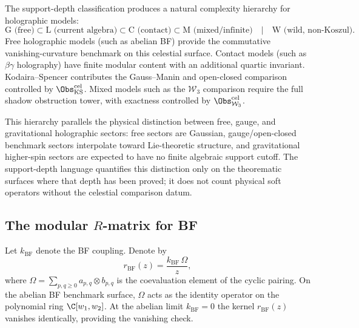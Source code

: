 \begin{remark}
The support-depth classification produces a natural complexity hierarchy for holographic
models:
\[
\text{G (free)} \subset \text{L (current algebra)} \subset \text{C (contact)}
\subset \text{M (mixed/infinite)}
\quad\bigl|\quad
\text{W (wild, non-Koszul)}.
\]
Free holographic models (such as abelian BF) provide the commutative
vanishing-curvature benchmark on this celestial surface.
Contact models (such as $\beta\gamma$ holography) have finite modular content with an
additional quartic invariant. Kodaira--Spencer contributes the Gauss--Manin
and open-closed comparison controlled by
$\Obs^{\mathrm{cel}}_{\mathrm{KS}}$. Mixed models such as the
$\mathcal{W}_3$ comparison require the full shadow obstruction tower,
with exactness controlled by $\Obs^{\mathrm{cel}}_{\mathcal W_3}$.

This hierarchy parallels the physical distinction between free, gauge, and
gravitational holographic sectors: free sectors are Gaussian, gauge/open-closed
benchmark sectors interpolate toward Lie-theoretic structure, and gravitational
higher-spin sectors are expected to have no finite algebraic support cutoff.
The support-depth language quantifies this distinction only on the theorematic
surfaces where that depth has been proved; it does not count physical soft
operators without the celestial comparison datum.
\end{remark}

\subsection{The modular $R$-matrix for BF}

\begin{definition}
Let $k_{\mathrm{BF}}$ denote the BF coupling. Denote by
\begin{equation}
r_{\mathrm{BF}}(z) = \frac{k_{\mathrm{BF}}\,\Omega}{z},
\end{equation}
where $\Omega = \sum_{p,q \geq 0} a_{p,q} \otimes b_{p,q}$ is the coevaluation
element of the cyclic pairing. On the abelian BF benchmark surface, $\Omega$
acts as the identity operator on the polynomial ring $\C[w_1, w_2]$. At the
abelian limit $k_{\mathrm{BF}} = 0$ the kernel $r_{\mathrm{BF}}(z)$ vanishes
identically, providing the vanishing check.
\end{definition}

